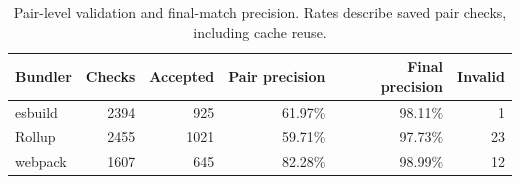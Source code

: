 \begin{table}[t]
\caption{Pair-level validation and final-match precision. Rates describe saved pair checks, including cache reuse.}
\label{tab:v8-validation}
\centering
\small
\begin{tabular}{lrrrrr}
\toprule
Bundler & Checks & Accepted & Pair precision & Final precision & Invalid\\
\midrule
esbuild & 2394 & 925 & 61.97\% & 98.11\% & 1\\
Rollup & 2455 & 1021 & 59.71\% & 97.73\% & 23\\
webpack & 1607 & 645 & 82.28\% & 98.99\% & 12\\
\bottomrule
\end{tabular}
\end{table}
